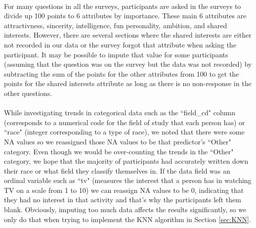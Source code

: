 \documentclass{article}
\begin{document}
\null\\
For many questions in all the surveys, participants are asked in the surveys to divide up 100 points to 6 attributes by importance.  These main 6 attributes are attractivness, sincerity, intelligence, fun personality, ambition, and shared interests.  However, there are several sections where the shared interests are either not recorded in our data or the survey forgot that attribute when asking the participant.  It may be possible to impute that value for some participants (assuming that the question was on the survey but the data was not recorded) by subtracting the sum of the points for the other attributes from 100 to get the points for the shared interests attribute as long as there is no non-response in the other questions.\\
\null\\
While investigating trends in categorical data such as the ``field\_cd" column (corresponds to a numerical code for the field of study that each person has) or ``race" (integer corresponding to a type of race), we noted that there were some NA values so we reassigned those NA values to be that predictor's ``Other" category.  Even though we would be over-counting the trends in the ``Other" category, we hope that the majority of participants had accurately written down their race or what field they classify themselves in.  If the data field was an ordinal variable such as ``tv" (measures the interest that a person has in watching TV on a scale from 1 to 10) we can reassign NA values to be 0, indicating that they had no interest in that activity and that's why the participants left them blank.  Obviously, imputing too much data affects the results significantly, so we only do that when trying to implement the KNN algorithm in Section \ref{sec:KNN}.
\end{document}
